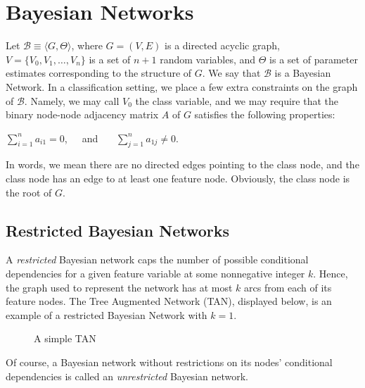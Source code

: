 \documentclass[12pt,twoside]{reedthesis}
\begin{document}
	\section{Bayesian Networks}	
	Let $\mathcal{B} \equiv \langle G, \Theta \rangle$, where $G = (V,E)$ is a directed acyclic graph, $V = \{V_0, V_1, \ldots, V_n \}$ is a set of $n + 1$ random variables, and $\Theta$ is a set of parameter estimates corresponding to the structure of $G$. We say that $\mathcal{B}$ is a Bayesian Network.
	In a classification setting, we place a few extra constraints on the graph of $\mathcal{B}$.
	Namely, we may call $V_0$ the class variable, and we may require that the binary node-node adjacency matrix $A$ of $G$ satisfies the following properties:
	\begin{center}
		$\displaystyle\sum_{i=1}^{n}a_{i1} = 0$,\ \ \ and \ \ \ 
		$\displaystyle\sum_{j=1}^{n}a_{1j} \neq 0$.
	\end{center}
	In words, we mean there are no directed edges pointing to the class node, and the class node has an edge to at least one feature node. Obviously, the class node is the root of $G$.
		
	\subsection*{Restricted Bayesian Networks}
	A {\em restricted} Bayesian network caps the number of possible conditional dependencies for a given feature variable at some nonnegative integer $k$. Hence, the graph used to represent the network has at most $k$ arcs from each of its feature nodes. The Tree Augmented Network (TAN), displayed below, is an example of a restricted Bayesian Network with $k = 1$.

	\begin{figure}[htpb]
	\begin{center}
	\end{center}
	\caption{A simple TAN}
	\label{simple tan}
	\end{figure}
	 Of course, a Bayesian network without restrictions on its nodes' conditional dependencies is called an {\em unrestricted} Bayesian network.
	
\end{document}
